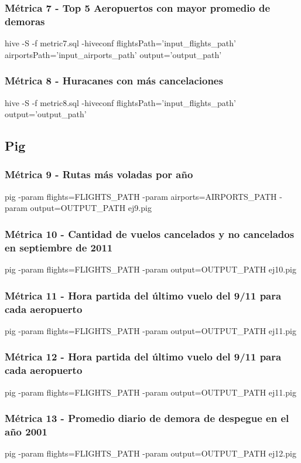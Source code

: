 \documentclass[a4paper,10pt]{article}
\begin{document}
        \subsubsection{Métrica 7 - Top 5 Aeropuertos con mayor promedio de demoras}
        \scriptsize{hive -S -f metric7.sql -hiveconf flightsPath='input\_flights\_path' airportsPath='input\_airports\_path' output='output\_path'}
        \subsubsection{Métrica 8 - Huracanes con más cancelaciones}
        \scriptsize{hive -S -f metric8.sql -hiveconf flightsPath='input\_flights\_path' output='output\_path'}

    \subsection{Pig}
        \subsubsection{Métrica 9 - Rutas más voladas por año}
            \scriptsize{pig -param flights=FLIGHTS\_PATH -param airports=AIRPORTS\_PATH -param output=OUTPUT\_PATH ej9.pig}
        \subsubsection{Métrica 10 - Cantidad de vuelos cancelados y no cancelados en septiembre de 2011}
            \scriptsize{pig -param flights=FLIGHTS\_PATH -param output=OUTPUT\_PATH ej10.pig}
        \subsubsection{Métrica 11 - Hora partida del último vuelo del 9/11 para cada aeropuerto}
            \scriptsize{pig -param flights=FLIGHTS\_PATH -param output=OUTPUT\_PATH ej11.pig}
        \subsubsection{Métrica 12 - Hora partida del último vuelo del 9/11 para cada aeropuerto}
            \scriptsize{pig -param flights=FLIGHTS\_PATH -param output=OUTPUT\_PATH ej11.pig}
        \subsubsection{Métrica 13 - Promedio diario de demora de despegue en el año 2001 }
            \scriptsize{pig -param flights=FLIGHTS\_PATH -param output=OUTPUT\_PATH ej12.pig}
\end{document}
